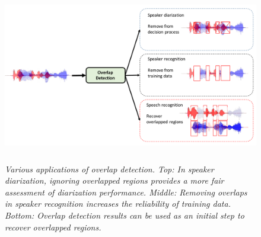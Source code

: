 \begin{figure}[h!]
	\centering
	\vspace{0mm}
	\includegraphics[height = 3in, width=\textwidth]{figures/overlap_detection_applications}
	\vspace{-3mm}
	\caption{\it \small Various applications of overlap detection. Top: In speaker diarization, ignoring overlapped regions provides a more fair assessment of diarization performance. Middle: Removing overlaps in speaker recognition increases the reliability of training data. Bottom: Overlap detection results can be used as an initial step to recover overlapped regions.}
	\label{fig:overlap_applications}
	\vspace{-3mm}
\end{figure}

